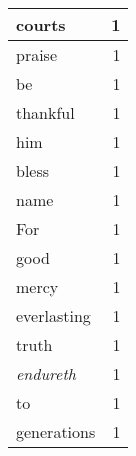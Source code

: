 \begin{center}
\begin{longtable}{l|r}
courts & 1 \\ \hline
praise & 1 \\ \hline
be & 1 \\ \hline
thankful & 1 \\ \hline
him & 1 \\ \hline
bless & 1 \\ \hline
name & 1 \\ \hline
For & 1 \\ \hline
good & 1 \\ \hline
mercy & 1 \\ \hline
everlasting & 1 \\ \hline
truth & 1 \\ \hline
\emph{endureth} & 1 \\ \hline
to & 1 \\ \hline
generations & 1 \\ \hline
\end{longtable}
\end{center}



\normalsize




